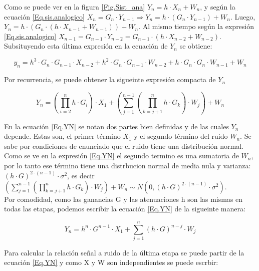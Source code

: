 \indent Como se puede ver en la figura \ref{Fig.Sist_ana} $Y_n = h \cdot X_n + W_n $, y según la ecuación \ref{Eq.sis.analogico}  $ X_n = G_n \cdot Y_{n-1} \Rightarrow Y_n = h \cdot (G_n \cdot Y_{n-1})+ W_n$. Luego,  $Y_n = h \cdot (G_n \cdot (h \cdot X_{n-1} + W_{n-1})) + W_n $. Al mismo tiempo según la expresión \ref{Eq.sis.analogico} $X_{n-1} = G_{n-1} \cdot Y_{n-2} = G_{n-1} \cdot (h \cdot X_{n-2} + W_{n-2})$. Subsituyendo esta última expresión en la ecuación de $Y_n$ se obtiene:

		\begin{equation}
			y_n = h^3 \cdot G_n \cdot G_{n-1} \cdot X_{n-2} + h^2 \cdot G_n \cdot G_{n-1} \cdot W_{n-2} + h \cdot G_n \cdot G_n \cdot W_{n-1} + W_n
			\label{Eq.yn}			
		\end{equation}

\indent Por recurrencia, se puede obtener la sigueinte expresión compacta de $Y_n$

		\begin{equation}
				Y_n = \left(\prod_{i=2}^{n}{h \cdot G_i} \right) \cdot X_1 + \left( \sum_{j=1}^{n-1} \left( \prod_{k=j+1}^{n} h \cdot G_k \right) \cdot W_j \right) + W_n
				\label{Eq.YN}
		\end{equation}
		
\indent En la ecuación \ref{Eq.YN} se notan dos partes bien definidas y de las cuales $Y_n$ depende. Estas son, el primer término $X_1$ y el segundo término del ruido $W_n$. Se sabe por condiciones de enunciado que el ruido tiene una distribución normal. Como se ve en la expresión \ref{Eq.YN} el segundo termino es una sumatoria de $W_n$, por lo tanto ese término tiene una distrbucion normal de media nula y varianza: $\left( h \cdot G \right)^{2 \cdot (n-1)} \cdot \sigma ^2$, es decir $\left( \sum_{j=1}^{n-1} \left( \prod_{k=j+1}^{n} h \cdot G_k \right) \cdot W_j \right) + W_n \sim N (0, \left( h \cdot G \right)^{2 \cdot (n-1)} \cdot \sigma ^2)$.\\

\indent Por comodidad, como las ganancias G y las atenuaciones h son las mismas en todas las etapas, podemos escribir la ecuación \ref{Eq.YN} de la sigueinte manera:

			\begin{equation}
				Y_n = h^n \cdot G^{n-1} \cdot X_1 + \sum_{j=1}^{n} \left( h \cdot G \right)^{n-j} \cdot W_j
				\label{Eq.Yreducida}
			\end{equation}

\indent Para calcular la relación señal a ruido de la última etapa se puede partir de la ecuación \ref{Eq.YN} y como X y W son independientes se puede escrbir:

